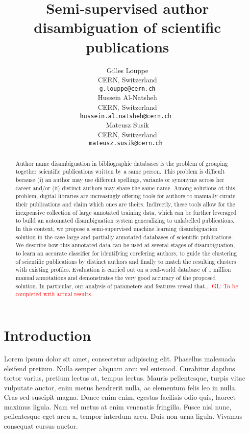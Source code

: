 \documentclass{article}
\title{Semi-supervised author disambiguation of scientific publications}
\author{Gilles Louppe\\
        CERN, Switzerland\\
        \texttt{g.louppe@cern.ch}\\
\And Hussein Al-Natsheh\\
        CERN, Switzerland\\
        \texttt{hussein.al.natsheh@cern.ch }\\
\And Mateusz Susik\\
        CERN, Switzerland\\
        \texttt{mateusz.susik@cern.ch }\\ }
\date{}
\newcommand{\glnote}[1]{\textcolor{red}{GL: #1}}
\begin{document}
\maketitle

\begin{abstract}

Author name disambiguation in bibliographic databases is the problem of
grouping together scientific publications written by a same person. This
problem is difficult because (i) an author may use different spellings,
variants or synonyms across her career and/or (ii) distinct authors may share
the same name. Among solutions ot this problem, digital libraries are
increasingly offering tools for authors to manually curate their publications
and claim which ones are theirs. Indirectly, these tools allow for the
inexpensive collection of large annotated training data, which can be further
leveraged to build an automated disambiguation system generalizing to
unlabelled publications. In this context, we propose a semi-supervised machine
learning disambiguation solution in the case large and partially annotated
databases of scientific publications. We describe how this annotated data can
be used at several stages of disambiguation, to learn an accurate classifier
for identifying corefering authors, to guide the clustering of scientific
publications by distinct authors and finally to match the resulting clusters
with existing profiles. Evaluation is carried out on a real-world database of 1
million manual annotations and demonstrates the very good accuracy of the
proposed solution. In particular, our analysis of parameters and features
reveal that... \glnote{To be completed with actual results.}

\end{abstract}



\section{Introduction}
\label{introduction}


Lorem ipsum dolor sit amet, consectetur adipiscing elit. Phasellus malesuada
eleifend pretium. Nulla semper aliquam arcu vel euismod. Curabitur dapibus
tortor varius, pretium lectus at, tempus lectus. Mauris pellentesque, turpis
vitae vulputate auctor, enim metus hendrerit nulla, ac elementum felis leo in
nulla. Cras sed suscipit magna. Donec enim enim, egestas facilisis odio quis,
laoreet maximus ligula. Nam vel metus at enim venenatis fringilla. Fusce nisl
nunc, pellentesque eget arcu a, tempor interdum arcu. Duis non urna ligula.
Vivamus consequat cursus auctor.
\end{document}
